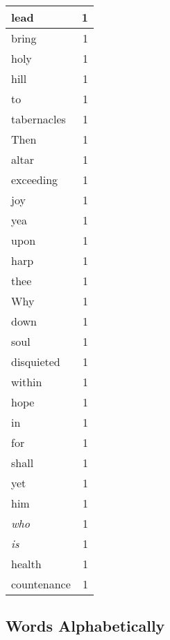 \begin{center}
\begin{longtable}{l|r}
lead & 1 \\ \hline
bring & 1 \\ \hline
holy & 1 \\ \hline
hill & 1 \\ \hline
to & 1 \\ \hline
tabernacles & 1 \\ \hline
Then & 1 \\ \hline
altar & 1 \\ \hline
exceeding & 1 \\ \hline
joy & 1 \\ \hline
yea & 1 \\ \hline
upon & 1 \\ \hline
harp & 1 \\ \hline
thee & 1 \\ \hline
Why & 1 \\ \hline
down & 1 \\ \hline
soul & 1 \\ \hline
disquieted & 1 \\ \hline
within & 1 \\ \hline
hope & 1 \\ \hline
in & 1 \\ \hline
for & 1 \\ \hline
shall & 1 \\ \hline
yet & 1 \\ \hline
him & 1 \\ \hline
\emph{who} & 1 \\ \hline
\emph{is} & 1 \\ \hline
health & 1 \\ \hline
countenance & 1 \\ \hline
\end{longtable}
\end{center}



\normalsize



\subsection{Words Alphabetically}

